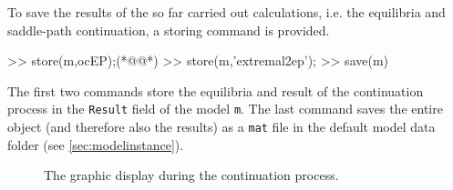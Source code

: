 To save the results of the so far carried out calculations, i.e. the equilibria and saddle-path continuation, a storing command is provided.
\begin{matlab} 
>> store(m,ocEP);(*@@*)
>> store(m,'extremal2ep');
>> save(m)
\end{matlab}
The first two commands store the equilibria and result of the continuation process in the \lstinline+Result+ field of the model \lstinline+m+. The last command saves the entire object (and therefore also the results) as a \lstinline+mat+ file in the default model data folder (see \cref{sec:modelinstance}).
\begin{figure}
\centering
{}
\caption{The graphic display during the continuation process.}
\label{fig:uniquemomcont}
\end{figure}

